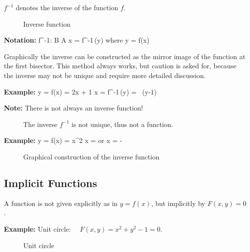 $f^{-1}$ denotes the inverse of the function $f$. \vs

\begin{figure}[!h]
   \centerline{\epsfxsize=11cm  } \svs
    \caption{Inverse function} \label{fig4}
\end{figure} \vs

{\bf Notation:}
\bnn f^{-1}: \; B \rightarrow A \enn \svs
\bnn x = f^{-1}\,(y) \qquad \mbox{where} \qquad y = f(x) \enn \svs

Graphically the inverse can be constructed as the mirror image of the function at the
first bisector. This method always works, but caution is asked for, because the inverse 
may not be unique and require more detailed discussion.

{\bf Example:}
\bnn y = f(x) = 2x + 1  \qquad  x = f^{-1}\,(y) =  \, (y-1) \enn

{\bf Note:} There is not always an inverse function!  \vs

\begin{figure}[!h]
   \centerline{\epsfxsize=11cm } \svs
    \caption{The inverse $f^{-1}$ is not unique, thus not a function.} \label{fig5}
\end{figure} \vs


{\bf Example:}
\bnn y = f(x) = x^2 \enn
\bnn x =  \qquad \mbox{or} \qquad x = - \enn  \vs

\begin{figure}[!h]
    \centering
    \hspace*{0.5cm}
     \svs
    \caption{Graphical construction of the inverse function} \label{fig6}
\end{figure}

\newpage
\subsection{Implicit Functions}
A function is not given explicitly as in $y = f(x)$, but
implicitly by $F(x,y) = 0$.

{\bf Example:} Unit circle: $\quad F(x,y)=x^2+y^2-1=0$. \svs

\begin{figure}[!h]
    \centerline{\epsfxsize=7cm \epsfysize=7cm } \svs
    \caption{Unit circle} \label{fig7}
\end{figure} \svs

